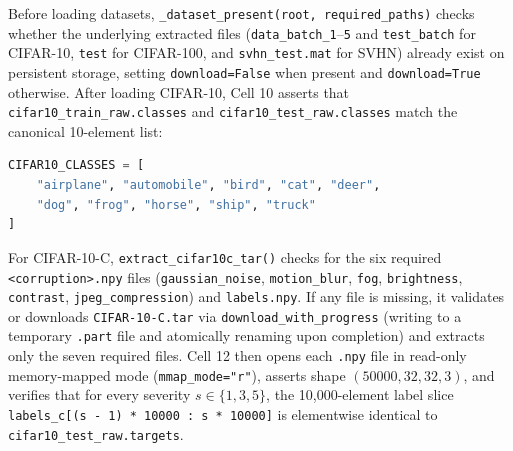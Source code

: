 \documentclass[11pt,a4paper]{article}
\begin{document}
Before loading datasets, \texttt{\_\allowbreak{}dataset\_\allowbreak{}present(\allowbreak{}root,\allowbreak{} required\_\allowbreak{}paths)} checks whether the underlying extracted files (\texttt{data\_\allowbreak{}batch\_\allowbreak{}1}--\texttt{5} and \texttt{test\_\allowbreak{}batch} for CIFAR-10, \texttt{test} for CIFAR-100, and \texttt{svhn\_\allowbreak{}test.\allowbreak{}mat} for SVHN) already exist on persistent storage, setting \texttt{download=False} when present and \texttt{download=True} otherwise. After loading CIFAR-10, Cell 10 asserts that \texttt{cifar10\_\allowbreak{}train\_\allowbreak{}raw.\allowbreak{}classes} and \texttt{cifar10\_\allowbreak{}test\_\allowbreak{}raw.\allowbreak{}classes} match the canonical 10-element list:
\begin{lstlisting}[language=Python]
CIFAR10_CLASSES = [
    "airplane", "automobile", "bird", "cat", "deer",
    "dog", "frog", "horse", "ship", "truck"
]
\end{lstlisting}

For CIFAR-10-C, \texttt{extract\_\allowbreak{}cifar10c\_\allowbreak{}tar(\allowbreak{})} checks for the six required \texttt{<corruption>.\allowbreak{}npy} files (\texttt{gaussian\_\allowbreak{}noise}, \texttt{motion\_\allowbreak{}blur}, \texttt{fog}, \texttt{brightness}, \texttt{contrast}, \texttt{jpeg\_\allowbreak{}compression}) and \texttt{labels.\allowbreak{}npy}. If any file is missing, it validates or downloads \texttt{CIFAR-10-C.\allowbreak{}tar} via \texttt{download\_\allowbreak{}with\_\allowbreak{}progress} (writing to a temporary \texttt{.\allowbreak{}part} file and atomically renaming upon completion) and extracts only the seven required files. Cell 12 then opens each \texttt{.\allowbreak{}npy} file in read-only memory-mapped mode (\texttt{mmap\_\allowbreak{}mode="r"}), asserts shape $(50000, 32, 32, 3)$, and verifies that for every severity $s \in \{1, 3, 5\}$, the 10,000-element label slice \texttt{labels\_\allowbreak{}c[(\allowbreak{}s - 1) * 10000 : s * 10000]} is elementwise identical to \texttt{cifar10\_\allowbreak{}test\_\allowbreak{}raw.\allowbreak{}targets}.
\end{document}
